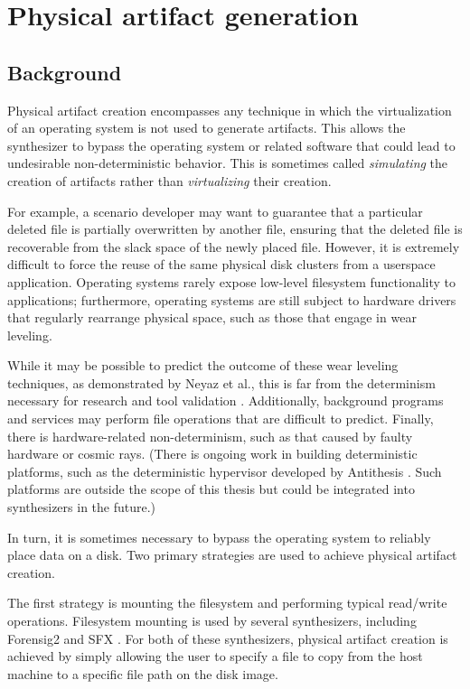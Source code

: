 \documentclass[letterpaper,12pt]{report}
\begin{document}
\section{Physical artifact
generation}\label{physical-artifact-generation}

\subsection{Background}\label{background}

Physical artifact creation encompasses any technique in which the
virtualization of an operating system is not used to generate artifacts.
This allows the synthesizer to bypass the operating system or related
software that could lead to undesirable non-deterministic behavior. This
is sometimes called \emph{simulating} the creation of artifacts rather
than \emph{virtualizing} their creation.

For example, a scenario developer may want to guarantee that a
particular deleted file is partially overwritten by another file,
ensuring that the deleted file is recoverable from the slack space of
the newly placed file. However, it is extremely difficult to force the
reuse of the same physical disk clusters from a userspace application.
Operating systems rarely expose low-level filesystem functionality to
applications; furthermore, operating systems are still subject to
hardware drivers that regularly rearrange physical space, such as those
that engage in wear leveling.

While it may be possible to predict the outcome of these wear leveling
techniques, as demonstrated by Neyaz et al., this is far from the
determinism necessary for research and tool validation
\cite{neyazForensicAnalysisWear2018}. Additionally, background
programs and services may perform file operations that are difficult to
predict. Finally, there is hardware-related non-determinism, such as
that caused by faulty hardware or cosmic rays. (There is ongoing work in
building deterministic platforms, such as the deterministic hypervisor
developed by Antithesis \cite{pshenichkinYouThinkYou2024}. Such
platforms are outside the scope of this thesis but could be integrated
into synthesizers in the future.)

In turn, it is sometimes necessary to bypass the operating system to
reliably place data on a disk. Two primary strategies are used to
achieve physical artifact creation.

The first strategy is mounting the filesystem and performing typical
read/write operations. Filesystem mounting is used by several
synthesizers, including Forensig2
\cite{mochForensicImageGenerator2009} and SFX
\cite{russellForensicImageDescription2012}. For both of these
synthesizers, physical artifact creation is achieved by simply allowing
the user to specify a file to copy from the host machine to a specific
file path on the disk image.
\end{document}
